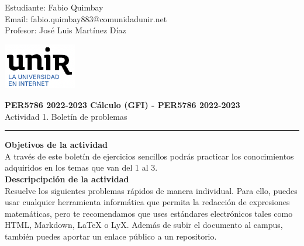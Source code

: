 \documentclass[11pt,letterpaper]{article}
\begin{document}
\pagestyle{plain}

\begin{flushleft}
	Estudiante: Fabio Quimbay\\
	Email: fabio.quimbay883@comunidadunir.net\\
	Profesor: José Luis Martínez Díaz\\
\end{flushleft}

\begin{flushright}\vspace{-15mm}
\includegraphics[height=2cm]{logo.png}
\end{flushright}
 
\begin{center}\vspace{0cm}
\textbf{\large PER5786 2022-2023  Cálculo (GFI) - PER5786 2022-2023}\\
Actividad 1. Boletín de problemas
\end{center}

 
\rule{\linewidth}{0.1mm}

\bigskip
\bigskip

\textbf{Objetivos de la actividad}\\

A través de este boletín de ejercicios sencillos podrás practicar los conocimientos adquiridos en los temas que van del 1 al 3.\\

\textbf{Descripcipción de la actividad}\\

Resuelve los siguientes problemas rápidos de manera individual. Para ello, puedes usar cualquier herramienta informática que permita la redacción de expresiones matemáticas, pero te recomendamos que uses estándares electrónicos tales como HTML, Markdown, LaTeX o LyX. Además de subir el documento al campus, también puedes aportar un enlace público a un repositorio. 

\end{document}
